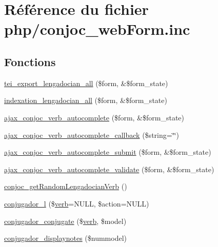 \hypertarget{php_2conjoc__web_form_8inc}{}\section{Référence du fichier php/conjoc\+\_\+web\+Form.inc}
\label{php_2conjoc__web_form_8inc}
\subsection*{Fonctions}
\begin{DoxyCompactItemize}
\item 
\hyperlink{php_2conjoc__web_form_8inc_a9c7725a828c1a44761bc51fe7a346215}{tei\+\_\+export\+\_\+lengadocian\+\_\+all} (\$form, \&\$form\+\_\+state)
\item 
\hyperlink{php_2conjoc__web_form_8inc_a465cce16b0d09f364ccb546c46c82306}{indexation\+\_\+lengadocian\+\_\+all} (\$form, \&\$form\+\_\+state)
\item 
\hyperlink{php_2conjoc__web_form_8inc_a3698c970fd73cda200a3a459dc50beec}{ajax\+\_\+conjoc\+\_\+verb\+\_\+autocomplete} (\$form, \&\$form\+\_\+state)
\item 
\hyperlink{php_2conjoc__web_form_8inc_a5ea54e98ecadf55b7fe917fe6237a52e}{ajax\+\_\+conjoc\+\_\+verb\+\_\+autocomplete\+\_\+callback} (\$string=\char`\"{}\char`\"{})
\item 
\hyperlink{php_2conjoc__web_form_8inc_add934c4187ded056db9c8369764a51ed}{ajax\+\_\+conjoc\+\_\+verb\+\_\+autocomplete\+\_\+submit} (\$form, \&\$form\+\_\+state)
\item 
\hyperlink{php_2conjoc__web_form_8inc_ae85a92c4f091005289a97fb20b8762ef}{ajax\+\_\+conjoc\+\_\+verb\+\_\+autocomplete\+\_\+validate} (\$form, \&\$form\+\_\+state)
\item 
\hyperlink{php_2conjoc__web_form_8inc_aacc782a067b5e8fdaeca34be9a282c61}{conjoc\+\_\+get\+Random\+Lengadocian\+Verb} ()
\item 
\hyperlink{php_2conjoc__web_form_8inc_aab99a7a60692cf7228d4a79924c32cb2}{conjugador\+\_\+l} (\$\hyperlink{teibase_8php_aa8d8fadfcf4239c7aa288414da9d0ace}{verb}=N\+U\+LL, \$action=N\+U\+LL)
\item 
\hyperlink{php_2conjoc__web_form_8inc_a5d341264c049e9bda5fd2d0acce4dfd7}{conjugador\+\_\+conjugate} (\$\hyperlink{teibase_8php_aa8d8fadfcf4239c7aa288414da9d0ace}{verb}, \$model)
\item 
\hyperlink{php_2conjoc__web_form_8inc_a16562f736e2ff741407adb1ceb3c9170}{conjugador\+\_\+displaynotes} (\$nummodel)

\end{DoxyCompactItemize}
